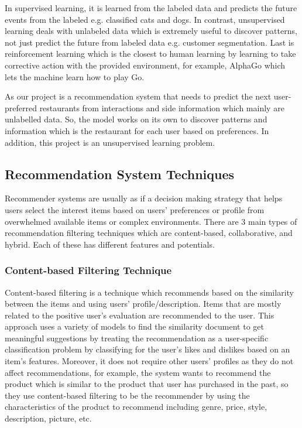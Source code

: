 \documentclass[12pt,oneside,openright,a4paper]{cpe-english-project}
\begin{document}
In supervised learning, it is learned from the labeled data and predicts the future events from the labeled e.g. classified cats and dogs. In contrast, unsupervised learning deals with unlabeled data which is extremely useful to discover patterns, not just predict the future from labeled data e.g. customer segmentation. Last is reinforcement learning which is the closest to human learning by learning to take corrective action with the provided environment, for example, AlphaGo which lets the machine learn how to play Go.

As our project is a recommendation system that needs to predict the next user-preferred restaurants from interactions and side information which mainly are unlabelled data. So, the model works on its own to discover patterns and information which is the restaurant for each user based on preferences. In addition, this project is an unsupervised learning problem.


\subsection{Recommendation System Techniques}

Recommender systems are usually as if a decision making strategy that helps users select the interest items based on users’ preferences or profile from overwhelmed available items or complex environments. There are 3 main types of recommendation filtering techniques which are content-based, collaborative, and hybrid. Each of these has different features and potentials.

\subsubsection{Content-based Filtering Technique}

Content-based filtering is a technique which recommends based on the similarity between the items and using users’ profile/description. Items that are mostly related to the positive user’s evaluation are recommended to the user. This approach uses a variety of models to find the similarity document to get meaningful suggestions by treating the recommendation as a user-specific classification problem by classifying for the user's likes and dislikes based on an item's features. \cite{Collaborativefiltering} Moreover, it does not require other users’ profiles as they do not affect recommendations, for example, the system wants to recommend the product which is similar to the product that user has purchased in the past, so they use content-based filtering to be the recommender by using the characteristics of the product to recommend including genre, price, style, description, picture, etc.
\end{document}
